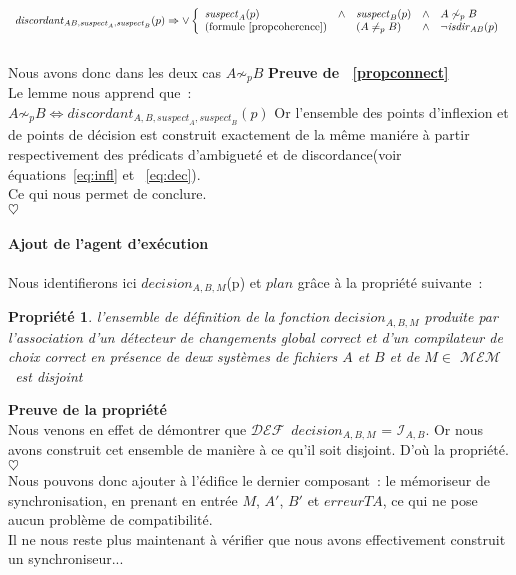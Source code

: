 \documentclass[11pt]{report}
\newtheorem{propri}{Propri\'et\'e}
\newcommand{\ddef}{\ensuremath{\mathcal{DEF}}}
\newcommand{\mem}{\ensuremath{\mathcal{MEM}}}
\newcommand{\infl}[2]{\ensuremath{\mathcal{I}_{#1,#2}}}
\newcommand{\sus}[1]{\ensuremath{\mathit{suspect}_{#1}}}
\newcommand{\isdira}[2]{\ensuremath{\mathit{isdir}_{#1#2}}}
\newcommand{\preuve}[2]{\textbf{Preuve #1} \\
#2\\
$\heartsuit$\\}
\begin{document}
{{\[
\begin{array}{l}
\mathit{discordant}_{AB, \sus{A}, \sus{B}}(p) \Rightarrow \vee \left\{
\begin{array}{lllll}
 \sus{A}(p) & \wedge & \sus{B}(p) & \wedge & A \not\sim_{p} B\\
 \mbox{(formule~\ref{propcoherence})} & & (A \neq_{p} B) & \wedge & \neg \isdira{A}{B}(p)
\end{array} \right.
\end{array}
\]\\
Nous avons donc dans les deux cas $A \not\sim_{p} B$
}
\preuve{de ~\ref{propconnect}}{
Le lemme nous apprend que~:\\
$A \not\sim_{p} B \Leftrightarrow \mathit{discordant}_{A, B, \sus{A}, \sus{B}}(p)$
Or l'ensemble des points d'inflexion et de points de d\'ecision est construit
exactement de la m\^eme mani\'ere \`a partir respectivement des pr\'edicats
d'ambiguet\'e et de discordance(voir \'equations~\ref{eq:infl} et
~\ref{eq:dec}).\\
Ce qui nous permet de conclure.}
\paragraph{Ajout de l'agent d'ex\'ecution\\}
Nous identifierons ici $\mathit{decision}_{A, B, M}$(p) et $\mathit{plan}$ 
gr\^ace \`a la propri\'et\'e suivante~:
\begin{propri}
l'ensemble de d\'efinition de la fonction $\mathit{decision}_{A, B, M}$ 
produite par l'association d'un d\'etecteur de changements global correct et
 d'un compilateur de choix correct en pr\'esence de deux syst\`emes de 
fichiers $A$ et $B$ et de $M \in$ \mem\ est \emph{disjoint}
\end{propri}
\preuve{de la propri\'et\'e}{
Nous venons en effet de d\'emontrer que \ddef\ 
$\mathit{decision}_{A, B, M}$ = \infl{A}{B}. Or nous avons construit cet 
ensemble de mani\`ere \`a ce qu'il soit disjoint. D'o\`u la propri\'et\'e.}
Nous pouvons donc ajouter \`a l'\'edifice le dernier composant~: le
m\'emoriseur de synchronisation, en prenant en entr\'ee $M$, $A'$, $B'$ et
$\mathit{erreurTA}$, ce qui ne pose aucun probl\`eme de compatibilit\'e.\\
Il ne nous reste plus maintenant \`a v\'erifier que nous avons effectivement
construit un synchroniseur...
}
\end{document}

